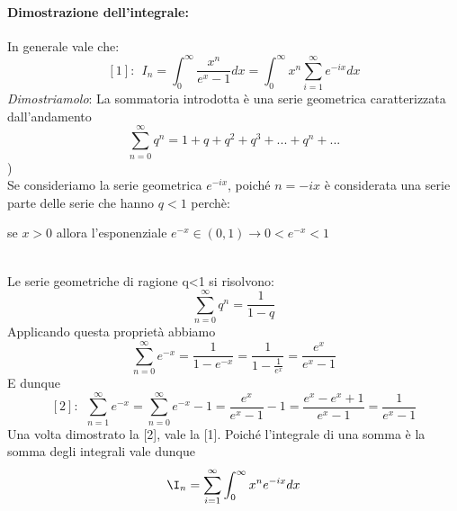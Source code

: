 \paragraph{Dimostrazione dell'integrale: }
In generale vale che: 
\[[1]: \ \  I_n = \int_0^\infty \frac{x^n}{e^x-1}dx = \int_0^\infty x^n\sum_{i=1}^{\infty} e^{-ix}dx \]
\textit{Dimostriamolo}: La sommatoria introdotta è una serie geometrica caratterizzata dall'andamento
\[\sum_{n=0}^{\infty}q^n = 1 + q + q^2 + q^3 + ... + q^n + ...\])\\
Se consideriamo la serie geometrica $e^{-ix}$, poiché $n = -ix$ è considerata una serie parte delle serie che hanno $q<1$ perchè:\\
\begin{cent}
se $x>0$ allora l'esponenziale $e^{-x} \in (0,1) \to 0<e^{-x}<1$
\end{cent}
\\Le serie geometriche di ragione q<1 si risolvono: 
\[ \sum_{n=0}^{\infty} q^n = \frac{1}{1-q}\]
Applicando questa proprietà abbiamo
\[ \sum_{n=0}^{\infty} e^{-x} = \frac{1}{1-e^{-x}} = \frac{1}{1-\frac{1}{e^x}} = \frac{e^x}{e^x-1}\]
E dunque
\[ [2]: \ \ \sum_{n=1}^{\infty} e^{-x} = \sum_{n=0}^{\infty} e^{-x} -1  = \frac{e^x}{e^x-1} -1 =  \frac{e^x-e^x + 1}{e^x -1} = \frac{1}{e^x -1} \]
Una volta dimostrato la [2], vale la [1]. Poiché l'integrale di una somma è la somma degli integrali vale dunque 
\[ \I_n = \sum_{i=1}^{\infty} \int_0^\infty x^n e^{-ix}dx \]
